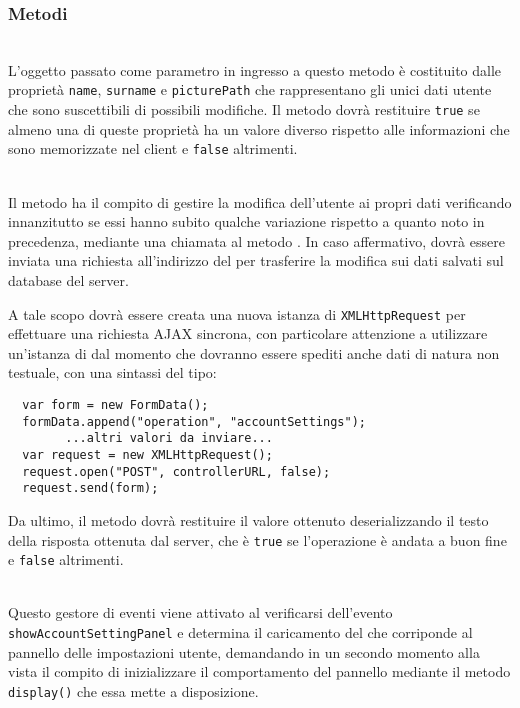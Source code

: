 \subsubsection*{Metodi}
\begin{description}

\item{}\\
L'oggetto passato come parametro in ingresso a questo metodo è costituito dalle proprietà \verb'name', \verb'surname' e \verb'picturePath' che rappresentano gli unici dati utente che sono suscettibili di possibili modifiche. Il metodo dovrà restituire \verb'true' se almeno una di queste proprietà ha un valore diverso rispetto alle informazioni che sono memorizzate nel client  e \verb'false' altrimenti.

\item{}\\
Il metodo ha il compito di gestire la modifica dell'utente ai propri dati verificando innanzitutto se essi hanno subito qualche variazione rispetto a quanto noto in precedenza, mediante una chiamata al metodo . In caso affermativo, dovrà essere inviata una richiesta all'indirizzo del  per trasferire la modifica sui dati salvati sul database del server.

A tale scopo dovrà essere creata una nuova istanza di \verb'XMLHttpRequest' per effettuare una richiesta AJAX sincrona, con particolare attenzione a utilizzare un'istanza di  dal momento che dovranno essere spediti anche dati di natura non testuale, con una sintassi del tipo:
\begin{verbatim}
  var form = new FormData();
  formData.append("operation", "accountSettings");
        ...altri valori da inviare...
  var request = new XMLHttpRequest();
  request.open("POST", controllerURL, false);
  request.send(form);
\end{verbatim}

Da ultimo, il metodo dovrà restituire il valore ottenuto deserializzando il testo della risposta ottenuta dal server, che è \verb'true' se l'operazione è andata a buon fine e \verb'false' altrimenti.

\item{}\\
Questo gestore di eventi viene attivato al verificarsi dell'evento \verb'showAccountSettingPanel' e determina il caricamento del  che corriponde al pannello delle impostazioni utente, demandando in un secondo momento alla vista il compito di inizializzare il comportamento del pannello mediante il metodo \verb'display()' che essa mette a disposizione.

\end{description}

